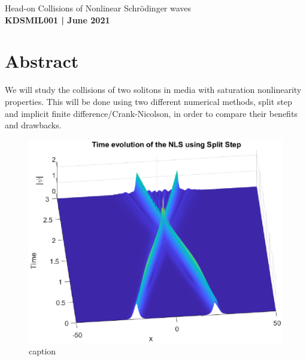 \documentclass[12pt]{article}
\numberwithin{equation}{section}
\numberwithin{figure}{section}
\numberwithin{table}{section}
\begin{document}
\begin{center}
    {\huge Head-on Collisions of Nonlinear Schr\"odinger waves}\\
    \vspace{0.2in}
    \textbf{KDSMIL001 | June 2021}

    \section*{Abstract}\label{sec:Abstract}
    We will study the collisions of two solitons in media with saturation nonlinearity properties. This will be done using two different numerical methods, split step and implicit finite difference/Crank-Nicolson, in order to compare their benefits and drawbacks.
\end{center}

\begin{figure}[H]
    \begin{center}
        \includegraphics{Plots/splitStep_S-05}
        \caption{caption}
        \label{label}
    \end{center}
\end{figure}
\end{document}
